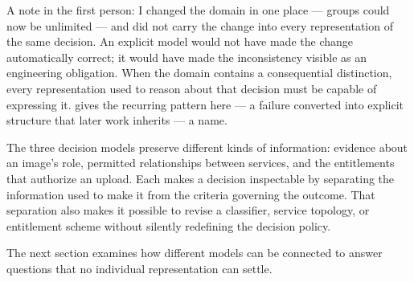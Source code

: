 
A note in the first person: I changed the domain in one place --- groups could now be unlimited --- and did not carry the change into every representation of the same decision. An explicit model would not have made the change automatically correct; it would have made the inconsistency visible as an engineering obligation. When the domain contains a consequential distinction, every representation used to reason about that decision must be capable of expressing it.  gives the recurring pattern here --- a failure converted into explicit structure that later work inherits --- a name.

The three decision models preserve different kinds of information: evidence about an image's role, permitted relationships between services, and the entitlements that authorize an upload. Each makes a decision inspectable by separating the information used to make it from the criteria governing the outcome. That separation also makes it possible to revise a classifier, service topology, or entitlement scheme without silently redefining the decision policy.

The next section examines how different models can be connected to answer questions that no individual representation can settle.
